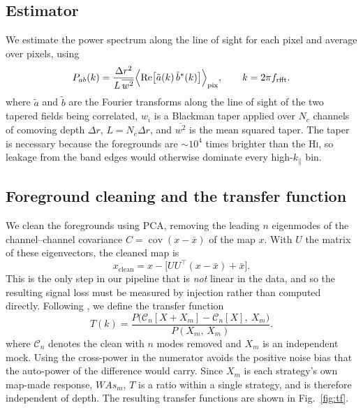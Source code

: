 \documentclass[a4paper,fleqn,usenatbib]{mnras}
\newcommand{\kpar}{k_{\parallel}}
\begin{document}
\subsection{Estimator}
We estimate the power spectrum along the line of sight for each pixel and
average over pixels, using
\begin{equation}
  P_{ab}(k) = \frac{\Delta r^{2}}{L\,\overline{w^{2}}}
    \Bigl\langle \operatorname{Re}\bigl[\tilde a(k)\,\tilde b^{*}(k)\bigr]
    \Bigr\rangle_{\mathrm{pix}},
  \qquad k = 2\pi f_{\mathrm{rfft}} .
  \label{eq:pkpar}
\end{equation}
where $\tilde a$ and $\tilde b$ are the Fourier transforms along the line of
sight of the two tapered fields being correlated, $w_i$ is a Blackman taper
applied over $N_c$ channels of comoving depth $\Delta r$, $L = N_c \Delta r$,
and $\overline{w^2}$ is the mean squared taper. The taper is necessary because
the foregrounds are $\sim10^{4}$ times brighter than the \textsc{Hi}, so
leakage from the band edges would otherwise dominate every high-$\kpar$ bin.

\subsection{Foreground cleaning and the transfer function}
We clean the foregrounds using PCA, removing the leading $n$ eigenmodes of the
channel--channel covariance $C = \operatorname{cov}(x - \bar{x})$ of the map
$x$.
With $U$ the matrix of these eigenvectors, the cleaned map is
\begin{equation}
  x_{\mathrm{clean}} = x - \bigl[ U U^{\top}(x - \bar{x}) + \bar{x} \bigr].
  \label{eq:pca}
\end{equation}
This is the only step in our pipeline that is \emph{not} linear in the data,
and so the resulting signal loss must be measured by injection rather than
computed directly. Following \citet{Cunnington2023}, we define the transfer
function
\begin{equation}
  T(k) = \frac{P\bigl(\mathcal{C}_n[X + X_m] - \mathcal{C}_n[X],\ X_m\bigr)}
              {P(X_m,\,X_m)} .
  \label{eq:tf}
\end{equation}
where $\mathcal{C}_n$ denotes the clean with $n$ modes removed and $X_m$ is an
independent mock. Using the cross-power in the numerator avoids the positive
noise bias that the auto-power of the difference would carry. Since $X_m$ is
each strategy's own map-made response, $WAs_m$, $T$ is a ratio within a single
strategy, and is therefore independent of depth. The resulting transfer
functions are shown in Fig.~\ref{fig:tf}.
\end{document}
